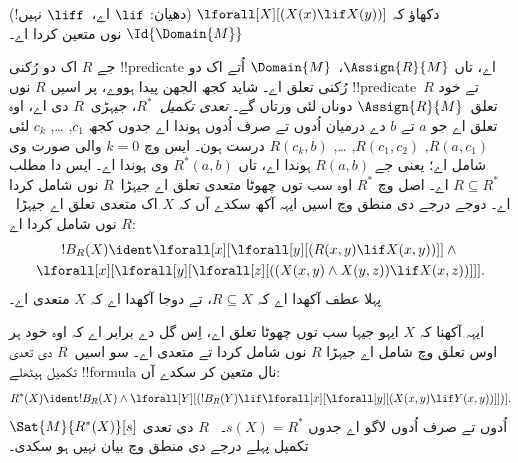 \documentclass[../../../include/open-logic-section]{subfiles}
\begin{document}
\begin{prob}
دکھاؤ کہ $\lforall[X][(X(x) \lif X(y))]$
(دھیان: $\lif$ اے،~$\liff$ نہیں!)
$\Id{\Domain{M}}$ نوں متعین کردا اے۔
\end{prob}

\begin{ex}
جے $R$ اک دو رُکنی !!{predicate} اے، تاں
$\Assign{R}{M}$،~$\Domain{M}$ اُتے
اک دو رُکنی تعلق اے۔ شاید کجھ الجھن
پیدا ہووے، پر اسیں $R$ نوں !!{predicate}~$R$
تے خود تعلق~$\Assign{R}{M}$ دوناں لئی
ورتاں گے۔ \emph{تعدی تکمیل}~$R^*$، جیہڑی~$R$
دی اے، اوہ تعلق اے جو $a$ تے $b$ دے درمیان
اُدوں تے صرف اُدوں ہوندا اے جدوں کجھ
$c_1$, \dots, $c_k$ لئی
$R(a,c_1)$, $R(c_1, c_2)$, \dots,
$R(c_k,b)$ درست ہون۔ ایس وچ $k = 0$
والی صورت وی شامل اے؛ یعنی جے
$R(a,b)$ ہوندا اے، تاں $R^*(a,b)$
وی ہوندا اے۔ ایس دا مطلب
$R \subseteq R^*$ اے۔ اصل وچ
$R^*$ اوہ سب توں چھوٹا متعدی تعلق اے
جیہڑا~$R$ نوں شامل کردا اے۔
دوجے درجے دی منطق وچ
اسیں ایہہ آکھ سکدے آں کہ $X$ اک
متعدی تعلق اے جیہڑا~$R$ نوں شامل
کردا اے:
\begin{multline*}
  !B_R(X) \ident \lforall[x][\lforall[y][(R(x,y) \lif X(x, y))]] \land {}\\
\lforall[x][\lforall[y][\lforall[z][((X(x,y) \land X(y,z)) \lif X(x,
      z))]]].
\end{multline*}
پہلا عطف آکھدا اے کہ $R \subseteq X$،
تے دوجا آکھدا اے کہ $X$ متعدی اے۔

ایہہ آکھنا کہ $X$ ایہو جیہا سب توں
چھوٹا تعلق اے، اِس گل دے برابر اے کہ
اوہ خود ہر اوس تعلق وچ شامل اے جیہڑا
$R$ نوں شامل کردا تے متعدی اے۔
سو اسیں~$R$ دی تعدی تکمیل ہیٹھلے
!!{formula} نال متعین کر سکدے آں:
\[
R^*(X) \ident !B_R(X) \land \lforall[Y][(!B_R(Y) \lif
  \lforall[x][\lforall[y][(X(x, y) \lif Y(x,y))]])].
\]
$\Sat{M}{R^*(X)}[s]$ اُدوں تے صرف اُدوں لاگو اے
جدوں $s(X) = R^*$۔
~$R$ دی تعدی تکمیل پہلے درجے دی
منطق وچ بیان نہیں ہو سکدی۔
\end{ex}
\end{document}
